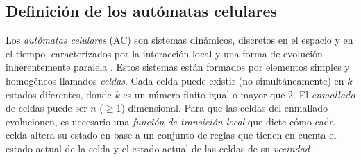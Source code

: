 \subsection{Definición de los autómatas celulares}
\label{section:def}

Los \emph{autómatas celulares} (AC) son sistemas dinámicos, discretos en el espacio y en el tiempo, caracterizados por la interacción local y una forma de evolución inherentemente paralela \cite{ilachinski2001cellular}. Estos sistemas están formados por elementos simples y homogéneos llamados \emph{celdas}. Cada celda puede existir (no simultáneamente) en $k$ estados diferentes, donde $k$ es un número finito igual o mayor que $2$. El \emph{enmallado} de celdas puede ser $n$ ($\ge 1$) dimensional. Para que las celdas del enmallado evolucionen, es necesario una \emph{función de transición local} que dicte cómo cada celda altera su estado en base a un conjunto de reglas que tienen en cuenta el estado actual de la celda y el estado actual de las celdas de su \emph{vecindad} \cite{schiff2007cellular}.